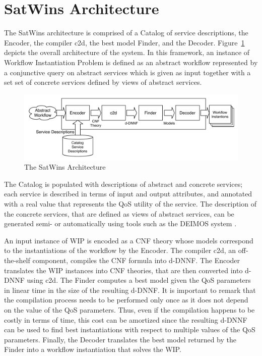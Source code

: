 \documentclass{llncs}
\begin{document}
\section{SatWins Architecture}
 The SatWins architecture  is comprised of a Catalog of service descriptions,
the Encoder, the compiler c2d, the best model Finder, and the Decoder.
Figure~\ref{fig:architecture} depicts the overall architecture of the system.
In this framework, an instance of Workflow Instantiation Problem is defined as an
abstract workflow represented by a conjunctive query on abstract services which
is given as input together with a set set of concrete services defined by views
of abstract services. 

\begin{figure}[t]
\centering
\includegraphics[width=.9\textwidth]{architecture}
\caption{The SatWins Architecture}
\label{fig:architecture}
\end{figure}

The Catalog is populated with descriptions of abstract and concrete services;
each service is described in terms of input and output attributes, and annotated
with a real value that represents the QoS utility of the service.
The description of the concrete services, that are defined as views of abstract
services, can be generated semi- or automatically using tools such as the DEIMOS
system \cite{AmbiteISWC09}. 

An input instance of WIP is encoded as a CNF theory whose models correspond to
the instantiations of the workflow by the Encoder. 
The compiler c2d, an off-the-shelf
component, compiles the CNF formula into d-DNNF.
The Encoder translates the WIP instances into CNF theories, that are then converted
into d-DNNF using c2d. The Finder computes a best model given the QoS parameters
in linear time in the size of the resulting d-DNNF. It is important to remark
that the compilation process needs to be performed only once as it does not
depend on the value of the QoS parameters. Thus, even if the compilation happens
to be costly in terms of time, this cost can be amortized since the resulting
d-DNNF can be used to find best instantiations with respect to multiple values
of the QoS parameters.
Finally, the Decoder translates the best model returned by the Finder into
a workflow instantiation that solves the WIP.
\end{document}
